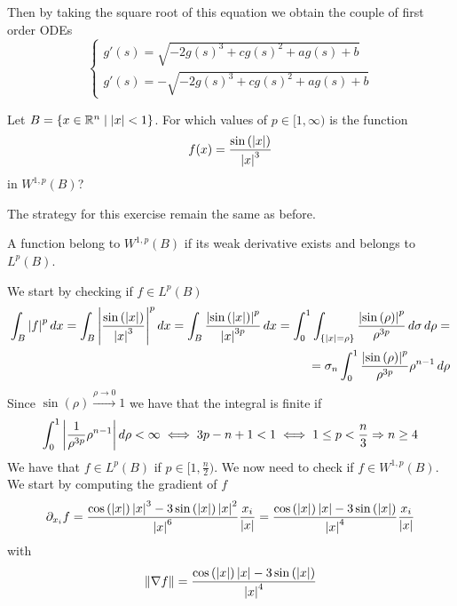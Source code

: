 Then by taking the square root of this equation we obtain the couple of first order ODEs
\[
    \begin{cases}
        g'(s) = \sqrt{-2 g(s)^3 + c g(s)^2 + a g(s) + b} \\
        g'(s) = -\sqrt{-2 g(s)^3 + c g(s)^2 + a g(s) + b}
    \end{cases}
\]

\newpage
\begin{exercise}
        Let \(B = \left\{ x \in \mathbb{R}^n \mid \abs{x} < 1 \right\}\). For which values of \(p \in [1, \infty) \) is the function
        \[
            f(x) = \frac{\sin\left(\abs{x}\right)}{\abs{x}^3}
        \]
        in \(W^{1, p}(B)\)?
\end{exercise}
The strategy for this exercise remain the same as before.
\begin{remark}
    A function belong to \(W^{1, p}(B)\) if its weak derivative exists and belongs to \(L^p(B)\).
\end{remark}
We start by checking if \(f \in L^p(B)\)
\[
    \begin{split}
        \int_B \abs{f}^p \, dx = \int_B \abs{\frac{\sin\left(\abs{x}\right)}{\abs{x}^3}}^p \, dx = \int_B \frac{\abs{\sin\left(\abs{x}\right)}^p}{\abs{x}^{3p}} \, dx = \int_0^1 \int_{\left\{\abs{x} = \rho\right\}} \frac{\abs{\sin\left(\rho\right)}^p}{\rho^{3p}} \, d\sigma \, d\rho = \\
        = \sigma_n \int_0^1 \frac{\abs{\sin\left(\rho\right)}^p}{\rho^{3p}} \rho^{n-1} \, d\rho
    \end{split}
\]
Since \(\sin\left(\rho\right) \overset{\rho \to 0}{\longrightarrow} 1\) we have that the integral is finite if
\[
    \begin{split}
        \int_0^1 \abs{\frac{1}{\rho^{3p}} \rho^{n-1}} \, d\rho < \infty \iff 3p - n + 1 < 1 \iff 1 \leq p < \frac{n}{3} \Rightarrow n \geq 4
    \end{split}
\]
We have that \(f \in L^p(B)\) if \(p \in [1, \frac{n}{2})\). We now need to check if \(f \in W^{1, p}(B)\). We start by computing the gradient of \(f\)
\[
    \begin{split}
        \partial_{x_i} f = \frac{\cos\left(\abs{x}\right) \abs{x}^3 - 3 \sin\left(\abs{x}\right) \abs{x}^2}{\abs{x}^6} \frac{x_i}{\abs{x}} = \frac{\cos\left(\abs{x}\right) \abs{x} - 3 \sin\left(\abs{x}\right)}{\abs{x}^4} \frac{x_i}{\abs{x}}
    \end{split}
\]
with 
\[
    \begin{split}
        \norm{\nabla f} = \frac{\cos\left(\abs{x}\right) \abs{x} - 3 \sin\left(\abs{x}\right)}{\abs{x}^4} 
    \end{split}
\]
